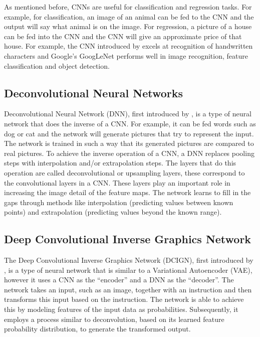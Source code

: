 \documentclass[conference]{IEEEtran}
\begin{document}
As mentioned before, CNNs are useful for classification and regression tasks. For example, for classification, an image of an animal can be fed to the CNN and the output will say what animal is on the image. For regression, a picture of a house can be fed into the CNN and the CNN will give an approximate price of that house. For example, the CNN introduced by \cite{lecun1998gradient} excels at recognition of handwritten characters and Google's GoogLeNet \cite{szegedy2015going} performs well in image recognition, feature classification and object detection.

\subsection{Deconvolutional Neural Networks} \label{DNN}
Deconvolutional Neural Network (DNN), first introduced by \cite{zeiler2010deconvolutional}, is a type of neural network that does the inverse of a CNN. For example, it can be fed words such as dog or cat and the network will generate pictures that try to represent the input. The network is trained in such a way that its generated pictures are compared to real pictures. To achieve the inverse operation of a CNN, a DNN replaces pooling steps with interpolation and/or extrapolation steps. The layers that do this operation are called deconvolutional or upsampling layers, these correspond to the convolutional layers in a CNN. These layers play an important role in increasing the image detail of the feature maps. The network learns to fill in the gaps through methods like interpolation (predicting values between known points) and extrapolation (predicting values beyond the known range).

\subsection{Deep Convolutional Inverse Graphics Network} \label{DCIGN}
The Deep Convolutional Inverse Graphics Network (DCIGN), first introduced by \cite{kulkarni2015deep}, is a type of neural network that is similar to a Variational Autoencoder (VAE), however it uses a CNN as the ``encoder'' and a DNN as the ``decoder''. The network takes an input, such as an image, together with an instruction and then transforms this input based on the instruction. The network is able to achieve this by modeling features of the input data as probabilities. Subsequently, it employs a process similar to deconvolution, based on its learned feature probability distribution, to generate the transformed output.
\end{document}
